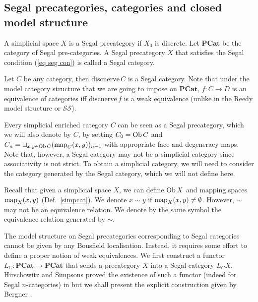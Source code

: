 \begin{refsection}
\subsection{Segal precategories, categories and closed model structure}
\begin{defin}
A simplicial space $X$ is a Segal precategory if $X_0$ is discrete. Let $\mathbf{PCat}$ be the category of Segal pre-categories. A Segal precategory $X$ that satisfies the Segal condition (\ref{eq seg con}) is called a Segal category.
\end{defin}

\begin{eg}
Let $C$ be any category, then $\mathrm{discnerve}\,C$ is a Segal category. Note that under the model category structure that we are going to impose on $\mathbf{PCat}$, $f:C\to D$ is an equivalence of categories iff $\mathrm{discnerve}\,f$ is a weak equivalence (unlike in the Reedy model structure or $\mathcal{SS}$).
\end{eg}

Every simplicial enriched category $C$ can be seen as a Segal precategory, which we will also denote by $C$, by setting $C_0=\operatorname{Ob} C$ and $C_n=\sqcup_{x,y\in\operatorname{Ob} C}(\operatorname{\mathrm{map}}_C(x,y))_{n-1}$ with appropriate face and degeneracy maps. Note that, however, a Segal category may not be a simplicial category since associativity is not strict. To obtain a simplicial category, we will need to consider the category generated by the Segal category, which we will not define here.

Recall that given a simplicial space $X$, we can define $\operatorname{Ob} X$ and mapping spaces $\operatorname{\mathrm{map}}_X(x,y)$ (Def.~\ref{simpcat}). We denote $x\sim y$ if $\operatorname{\mathrm{map}}_X(x,y)\ne\emptyset$. However, $\sim$ may not be an equivalence relation. We denote by the same symbol the equivalence relation generated by $\sim$.

The model structure on Segal precategories corresponding to Segal categories cannot be given by any Bousfield localisation. Instead, it requires some effort to define a proper notion of weak equivalences. We first construct a functor $L_C:\mathbf{PCat}\to\mathbf{PCat}$ that sends a precategory $X$ into a Segal category $L_CX$. Hirschowitz and Simpsons proved the existence of such a functor (indeed for Segal $n$-categories) in \cite{hirschowitz-simpson-descente-pour-les-n-champs} but we shall present the explicit construction given by Bergner \cite{bergner-three-models-for-the-homotopy-theory-of-homotopy-theories}.


\end{refsection}
